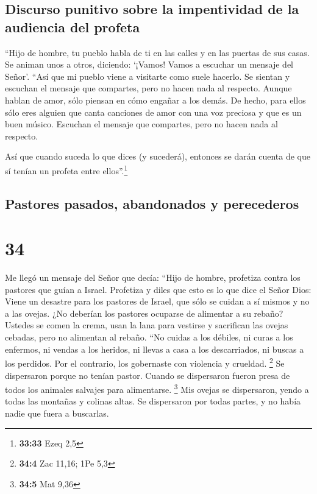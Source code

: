 \hypertarget{discurso-punitivo-sobre-la-impentividad-de-la-audiencia-del-profeta}{%
\subsection{Discurso punitivo sobre la impentividad de la audiencia del
profeta}\label{discurso-punitivo-sobre-la-impentividad-de-la-audiencia-del-profeta}}

 ``Hijo de hombre, tu pueblo habla de ti en las calles y
en las puertas de sus casas. Se animan unos a otros, diciendo: `¡Vamos!
Vamos a escuchar un mensaje del Señor'.  ``Así que mi
pueblo viene a visitarte como suele hacerlo. Se sientan y escuchan el
mensaje que compartes, pero no hacen nada al respecto. Aunque hablan de
amor, sólo piensan en cómo engañar a los demás.  De
hecho, para ellos sólo eres alguien que canta canciones de amor con una
voz preciosa y que es un buen músico. Escuchan el mensaje que compartes,
pero no hacen nada al respecto.

 Así que cuando suceda lo que dices (y sucederá),
entonces se darán cuenta de que sí tenían un profeta entre
ellos''.\footnote{\textbf{33:33} Ezeq 2,5}

\hypertarget{pastores-pasados-abandonados-y-perecederos}{%
\subsection{Pastores pasados, abandonados y
perecederos}\label{pastores-pasados-abandonados-y-perecederos}}

\hypertarget{section-33}{%
\section{34}\label{section-33}}

 Me llegó un mensaje del Señor que decía: 
``Hijo de hombre, profetiza contra los pastores que guían a Israel.
Profetiza y diles que esto es lo que dice el Señor Dios: Viene un
desastre para los pastores de Israel, que sólo se cuidan a sí mismos y
no a las ovejas. ¿No deberían los pastores ocuparse de alimentar a su
rebaño?  Ustedes se comen la crema, usan la lana para
vestirse y sacrifican las ovejas cebadas, pero no alimentan al rebaño.
 ``No cuidas a los débiles, ni curas a los enfermos, ni
vendas a los heridos, ni llevas a casa a los descarriados, ni buscas a
los perdidos. Por el contrario, los gobernaste con violencia y crueldad.
\footnote{\textbf{34:4} Zac 11,16; 1Pe 5,3}  Se
dispersaron porque no tenían pastor. Cuando se dispersaron fueron presa
de todos los animales salvajes para alimentarse. \footnote{\textbf{34:5}
  Mat 9,36}  Mis ovejas se dispersaron, yendo a todas las
montañas y colinas altas. Se dispersaron por todas partes, y no había
nadie que fuera a buscarlas.

